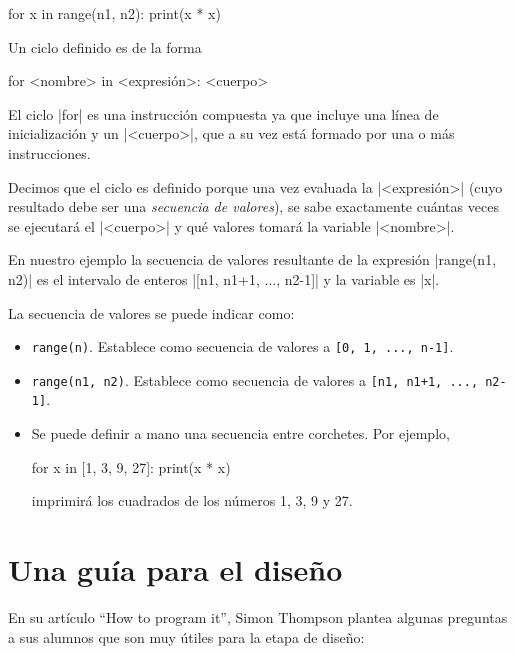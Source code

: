 \begin{codigo-python-sn}
for x in range(n1, n2):
    print(x * x)
\end{codigo-python-sn}

Un ciclo definido es de la forma
\begin{codigo-python-sn}
for <nombre> in <expresión>:
    <cuerpo>
\end{codigo-python-sn}

El ciclo |for| es una instrucción compuesta ya que incluye una línea de
inicialización y un |<cuerpo>|, que a su vez está formado por una o más
instrucciones.

Decimos que el ciclo es definido porque una vez evaluada la |<expresión>|
(cuyo resultado debe ser una \emph{secuencia de valores}),
se sabe exactamente cuántas veces se ejecutará
el |<cuerpo>| y qué valores tomará la variable |<nombre>|.

En nuestro ejemplo la secuencia de valores resultante de la expresión
|range(n1, n2)| es el intervalo de enteros |[n1, n1+1, ..., n2-1]| y la variable
es |x|.

La secuencia de valores se puede indicar como:

\begin{itemize}
\item \lstinline!range(n)!. Establece como secuencia de valores a
 \lstinline![0, 1, ..., n-1]!.

\item \lstinline!range(n1, n2)!. Establece como secuencia de valores a
\lstinline![n1, n1+1, ..., n2-1]!.

\item Se puede definir a mano una secuencia entre corchetes. Por ejemplo,
\begin{codigo-python-sn}
for x in [1, 3, 9, 27]:
    print(x * x)
\end{codigo-python-sn}
imprimirá los cuadrados de los números 1, 3, 9 y 27.
\end{itemize}

\section{Una guía para el diseño}

En su artículo ``How to program it'', Simon Thompson plantea
algunas preguntas a sus alumnos que son muy útiles para la etapa
de diseño:


